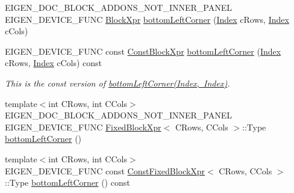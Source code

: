 \begin{DoxyCompactItemize}
E\+I\+G\+E\+N\+\_\+\+D\+O\+C\+\_\+\+B\+L\+O\+C\+K\+\_\+\+A\+D\+D\+O\+N\+S\+\_\+\+N\+O\+T\+\_\+\+I\+N\+N\+E\+R\+\_\+\+P\+A\+N\+EL E\+I\+G\+E\+N\+\_\+\+D\+E\+V\+I\+C\+E\+\_\+\+F\+U\+NC \mbox{\hyperlink{class_eigen_1_1_block}{Block\+Xpr}} \mbox{\hyperlink{class_eigen_1_1_sparse_matrix_base_a6557dcd3512c07370630d5ce0c3fbd3e}{bottom\+Left\+Corner}} (\mbox{\hyperlink{struct_eigen_1_1_eigen_base_a554f30542cc2316add4b1ea0a492ff02}{Index}} c\+Rows, \mbox{\hyperlink{struct_eigen_1_1_eigen_base_a554f30542cc2316add4b1ea0a492ff02}{Index}} c\+Cols)
\item 
\mbox{\label{class_eigen_1_1_sparse_matrix_base_aa56c62b99e26e37c5f93ea83e0c3ba58}} 
E\+I\+G\+E\+N\+\_\+\+D\+E\+V\+I\+C\+E\+\_\+\+F\+U\+NC const \mbox{\hyperlink{class_eigen_1_1_block}{Const\+Block\+Xpr}} \mbox{\hyperlink{class_eigen_1_1_sparse_matrix_base_aa56c62b99e26e37c5f93ea83e0c3ba58}{bottom\+Left\+Corner}} (\mbox{\hyperlink{struct_eigen_1_1_eigen_base_a554f30542cc2316add4b1ea0a492ff02}{Index}} c\+Rows, \mbox{\hyperlink{struct_eigen_1_1_eigen_base_a554f30542cc2316add4b1ea0a492ff02}{Index}} c\+Cols) const
\begin{DoxyCompactList}\small\item\em This is the const version of \mbox{\hyperlink{class_eigen_1_1_sparse_matrix_base_a6557dcd3512c07370630d5ce0c3fbd3e}{bottom\+Left\+Corner(\+Index, Index)}}. \end{DoxyCompactList}\item 
{\footnotesize template$<$int C\+Rows, int C\+Cols$>$ }\\E\+I\+G\+E\+N\+\_\+\+D\+O\+C\+\_\+\+B\+L\+O\+C\+K\+\_\+\+A\+D\+D\+O\+N\+S\+\_\+\+N\+O\+T\+\_\+\+I\+N\+N\+E\+R\+\_\+\+P\+A\+N\+EL E\+I\+G\+E\+N\+\_\+\+D\+E\+V\+I\+C\+E\+\_\+\+F\+U\+NC \mbox{\hyperlink{struct_eigen_1_1_sparse_matrix_base_1_1_fixed_block_xpr}{Fixed\+Block\+Xpr}}$<$ C\+Rows, C\+Cols $>$\+::Type \mbox{\hyperlink{class_eigen_1_1_sparse_matrix_base_af0e6f2ff2f449cae8f7b19bd34dec4ce}{bottom\+Left\+Corner}} ()
\item 
\mbox{\label{class_eigen_1_1_sparse_matrix_base_a02ac940609eb16204bb7edffd7786c8f}} 
{\footnotesize template$<$int C\+Rows, int C\+Cols$>$ }\\E\+I\+G\+E\+N\+\_\+\+D\+E\+V\+I\+C\+E\+\_\+\+F\+U\+NC const \mbox{\hyperlink{struct_eigen_1_1_sparse_matrix_base_1_1_const_fixed_block_xpr}{Const\+Fixed\+Block\+Xpr}}$<$ C\+Rows, C\+Cols $>$\+::Type \mbox{\hyperlink{class_eigen_1_1_sparse_matrix_base_a02ac940609eb16204bb7edffd7786c8f}{bottom\+Left\+Corner}} () const

\end{DoxyCompactItemize}
